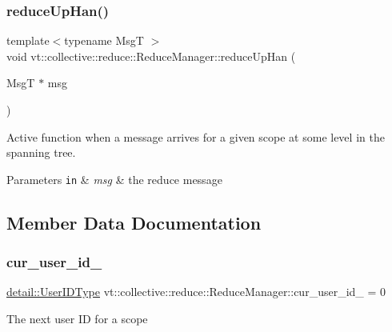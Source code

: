 \subsubsection{\texorpdfstring{reduce\+Up\+Han()}{reduceUpHan()}}
{\footnotesize\ttfamily template$<$typename MsgT $>$ \\
void vt\+::collective\+::reduce\+::\+Reduce\+Manager\+::reduce\+Up\+Han (\begin{DoxyParamCaption}\item[{MsgT $\ast$}]{msg }\end{DoxyParamCaption})\hspace{0.3cm}{\ttfamily [static]}}



Active function when a message arrives for a given scope at some level in the spanning tree. 


\begin{DoxyParams}[1]{Parameters}
\mbox{\tt in}  & {\em msg} & the reduce message \\
\hline
\end{DoxyParams}


\subsection{Member Data Documentation}
\mbox{\label{structvt_1_1collective_1_1reduce_1_1_reduce_manager_a716c66493c02898d5ac8c2b8ca62efd0}} 
\subsubsection{\texorpdfstring{cur\+\_\+user\+\_\+id\+\_\+}{cur\_user\_id\_}}
{\footnotesize\ttfamily \hyperlink{namespacevt_1_1collective_1_1reduce_1_1detail_ae82d7b96b0885b9b7dfb0104398beead}{detail\+::\+User\+I\+D\+Type} vt\+::collective\+::reduce\+::\+Reduce\+Manager\+::cur\+\_\+user\+\_\+id\+\_\+ = 0\hspace{0.3cm}{\ttfamily [private]}}

The next user ID for a scope \mbox{\label{structvt_1_1collective_1_1reduce_1_1_reduce_manager_a8226dde1ab69b8332db65f558f405ad5}} 
